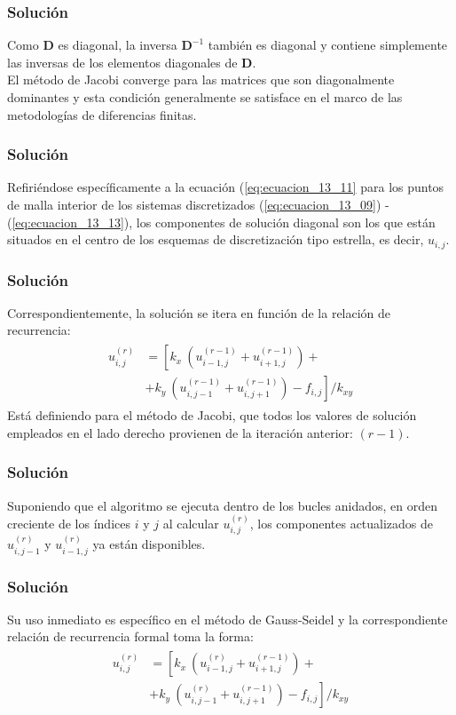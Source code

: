 \begin{frame}
\frametitle{Solución}
Como $\mathbf{D}$ es diagonal, la inversa $\mathbf{D}^{-1}$ también es diagonal y contiene simplemente las inversas de los elementos diagonales de $\mathbf{D}$.
\\
\bigskip
El método de Jacobi converge para las matrices que son diagonalmente dominantes y esta condición generalmente se satisface en el marco de las metodologías de diferencias finitas.
\end{frame}
\begin{frame}
\frametitle{Solución}
Refiriéndose específicamente a la ecuación (\ref{eq:ecuacion_13_11} para los puntos de malla interior de los sistemas discretizados (\ref{eq:ecuacion_13_09}) - (\ref{eq:ecuacion_13_13}), los componentes de solución diagonal son los que están situados en el centro de los esquemas de discretización tipo estrella, es decir, $u_{i,j}$.
\end{frame}
\begin{frame}
\frametitle{Solución}
Correspondientemente, la solución se itera en función de la relación de recurrencia:
\begin{align}
\begin{aligned}
u_{i,j}^{(r)} &= \left[ k_{x} \: \left( u_{i-1,j}^{(r-1)} + u_{i+1, j}^{(r-1)} \right) + \right. \\
&+ \left. k_{y} \: \left( u_{i,j-1}^{(r-1)} + u_{i, j+1}^{(r-1)} \right) - f_{i,j} \right] / k_{xy}
\end{aligned}
\label{eq:ecuacion_13_22} 	
\end{align}
\pause
Está definiendo para el método de Jacobi, que todos los valores de solución empleados en el lado derecho provienen de la iteración anterior: $(r - 1)$.
\end{frame}
\begin{frame}
\frametitle{Solución}
Suponiendo que el algoritmo se ejecuta dentro de los bucles anidados, en orden creciente de los índices $i$ y $j$ al calcular $u_{i,j}^{(r)}$, los componentes actualizados de $u_{i, j-1}^{(r)}$ y $u_{i-1, j}^{(r)}$ ya están disponibles.
\end{frame}
\begin{frame}
\frametitle{Solución}
Su uso inmediato es específico en el método de Gauss-Seidel y la correspondiente relación de recurrencia formal toma la forma:
\begin{align}
\begin{aligned}
u_{i,j}^{(r)} &= \left[ k_{x} \: \left( u_{i-1,j}^{(r)} + u_{i+1, j}^{(r-1)} \right) + \right. \\
&+ \left. k_{y} \: \left( u_{i,j-1}^{(r)} + u_{i, j+1}^{(r-1)} \right) - f_{i,j} \right] / k_{xy}
\end{aligned}
\label{eq:ecuacion_13_23} 	
\end{align}
\end{frame}
